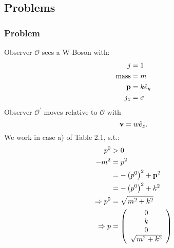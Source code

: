 \subsection{Problems}\label{susec:2_problems}
\subsubsection{Problem}
Observer $\mathcal{O}$ sees a W-Boson with:
\begin{align*}
	j&=1\\
	\text{mass} &=m\\
	\mathbf{p}&=k\hat{e}_y\\
	j_z&=\sigma
\end{align*}
Observer $\mathcal{O}^\prime$ moves relative to $\mathcal{O}$ with \[\mathbf{v}=w\hat{e}_z.\]
We work in case a) of Table 2.1, s.t.:
\begin{align*}
	p^0&>0\\
	-m^2&=p^2\\
	&=-\left(p^0\right)^2+\mathbf{p}^2\\
	&=-\left(p^0\right)^2+k^2\\
	\Rightarrow p^0&=\sqrt{m^2+k^2}\\
	\Rightarrow p&=
	\left(\begin{array}{c}
		0\\
		k\\
		0\\
		\sqrt{m^2+k^2}
	\end{array}\right)
\end{align*}
